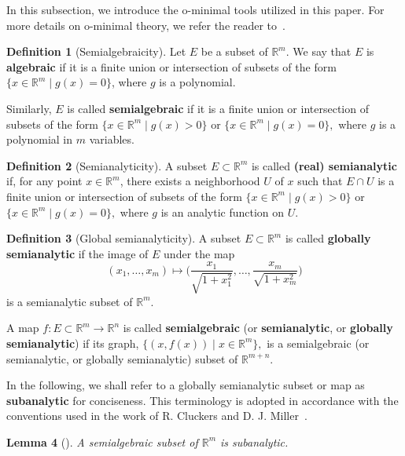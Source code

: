 \documentclass{compositio}
\numberwithin{equation}{section}
\numberwithin{figure}{section}
\theoremstyle{definition}
\newtheorem{definition}{Definition}[section]
\theoremstyle{plain}
\newtheorem{lemma}[definition]{Lemma}
\begin{document}
{In this subsection, we introduce the o-minimal tools utilized in this paper. For more details on o-minimal theory, we refer the reader to~\cite{om}.

\begin{definition}[Semialgebraicity]\label{def:semialge}
    Let $E$ be a subset of $\mathbb{R}^m$. We say that $E$ is \textbf{algebraic} if it is a finite union or intersection of subsets of the form $\{x \in \mathbb{R}^m \mid g(x) = 0\}$, where $g$ is a polynomial. 

    Similarly, $E$ is called \textbf{semialgebraic} if it is a finite union or intersection of subsets of the form $\{x \in \mathbb{R}^m \mid g(x) > 0\}$ or $\{x \in \mathbb{R}^m \mid g(x) = 0\},$
    where $g$ is a polynomial in $m$ variables.
\end{definition}

\begin{definition}[Semianalyticity]\label{def:semianalytic}
    A subset $E \subset \mathbb{R}^m$ is called \textbf{(real) semianalytic} if, for any point $x \in \mathbb{R}^m$, there exists a neighborhood $U$ of $x$ such that $E \cap U$ is a finite union or intersection of subsets of the form 
    $\{x \in \mathbb{R}^m \mid g(x) > 0\}$ or $\{x \in \mathbb{R}^m \mid g(x) = 0\},$
    where $g$ is an analytic function on $U$.    
\end{definition}

\begin{definition}[Global semianalyticity]
    A subset $E \subset \mathbb{R}^m$ is called \textbf{globally semianalytic} if the image of $E$ under the map
    $$
    (x_1, \ldots, x_m) \mapsto \bigg(\frac{x_1}{\sqrt{1+x_1^2}}, \ldots, \frac{x_m}{\sqrt{1+x_m^2}}\bigg)
    $$
    is a semianalytic subset of $\mathbb{R}^m$.
\end{definition}

A map $f: E \subset \mathbb{R}^m \to \mathbb{R}^n$ is called \textbf{semialgebraic} (or \textbf{semianalytic}, or \textbf{globally semianalytic}) if its graph,
$
\{(x, f(x)) \mid x \in \mathbb{R}^m\},
$
is a semialgebraic (or semianalytic, or globally semianalytic) subset of $\mathbb{R}^{m+n}$.

In the following, we shall refer to a globally semianalytic subset or map as \textbf{subanalytic} for conciseness. This terminology is adopted in accordance with the conventions used in the work of R. Cluckers and D. J. Miller~\cite{intsta}.

\begin{lemma}[\cite{om}]\label{lem:semalgeimplysubanaly}
    A semialgebraic subset of $\mathbb{R}^m$ is subanalytic.
\end{lemma}

}
\end{document}
